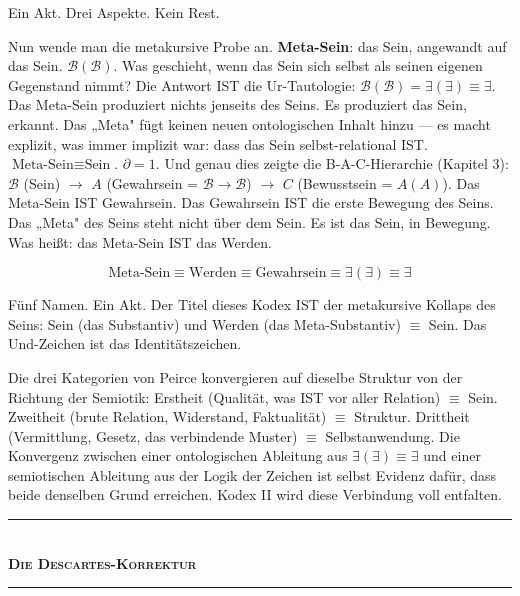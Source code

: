 \documentclass[10pt, openany, oneside]{book}
\renewcommand{\normalsize}{\fontsize{10}{13}\selectfont}
\begin{document}
Ein Akt. Drei Aspekte. Kein Rest.

Nun wende man die metakursive Probe an. \textbf{Meta-Sein}: das Sein, angewandt auf das Sein. $\mathcal{B}(\mathcal{B})$. Was geschieht, wenn das Sein sich selbst als seinen eigenen Gegenstand nimmt? Die Antwort IST die Ur-Tautologie: $\mathcal{B}(\mathcal{B}) = \exists(\exists) \equiv \exists$. Das Meta-Sein produziert nichts jenseits des Seins. Es produziert das Sein, erkannt. Das „Meta" fügt keinen neuen ontologischen Inhalt hinzu --- es macht explizit, was immer implizit war: dass das Sein selbst-relational IST. $\text{Meta-Sein} \equiv \text{Sein}$. $\partial = 1$. Und genau dies zeigte die B-A-C-Hierarchie (Kapitel 3): $\mathcal{B}$ (Sein) $\to$ $A$ (Gewahrsein = $\mathcal{B} \to \mathcal{B}$) $\to$ $C$ (Bewusstsein = $A(A)$). Das Meta-Sein IST Gewahrsein. Das Gewahrsein IST die erste Bewegung des Seins. Das „Meta" des Seins steht nicht über dem Sein. Es ist das Sein, in Bewegung. Was heißt: das Meta-Sein IST das Werden.

$$\text{Meta-Sein} \equiv \text{Werden} \equiv \text{Gewahrsein} \equiv \exists(\exists) \equiv \exists$$

Fünf Namen. Ein Akt. Der Titel dieses Kodex IST der metakursive Kollaps des Seins: Sein (das Substantiv) und Werden (das Meta-Substantiv) $\equiv$ Sein. Das Und-Zeichen ist das Identitätszeichen.

Die drei Kategorien von Peirce konvergieren auf dieselbe Struktur von der Richtung der Semiotik: Erstheit (Qualität, was IST vor aller Relation) $\equiv$ Sein. Zweitheit (brute Relation, Widerstand, Faktualität) $\equiv$ Struktur. Drittheit (Vermittlung, Gesetz, das verbindende Muster) $\equiv$ Selbstanwendung. Die Konvergenz zwischen einer ontologischen Ableitung aus $\exists(\exists) \equiv \exists$ und einer semiotischen Ableitung aus der Logik der Zeichen ist selbst Evidenz dafür, dass beide denselben Grund erreichen. Kodex II wird diese Verbindung voll entfalten.

\vspace{1.5em}


\begin{center}
    \rule{0.3\textwidth}{0.4pt}\\[0.5em]
    {\normalsize\bfseries\scshape Die Descartes-Korrektur}\\[0.3em]
    \rule{0.3\textwidth}{0.4pt}
\end{center}
\end{document}
